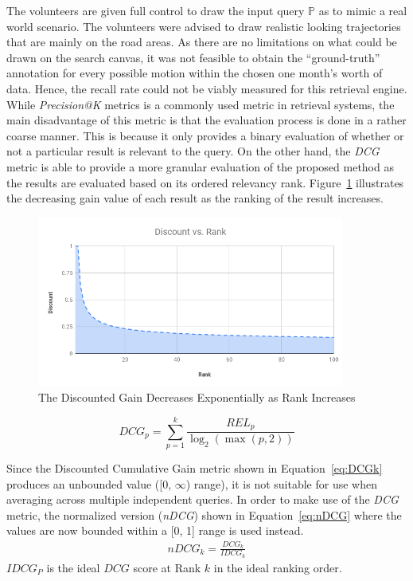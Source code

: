 The volunteers are given full control to draw the input query $\mathbb{P}$ as to mimic a real world scenario. The volunteers were advised to draw realistic looking trajectories that are mainly on the road areas. As there are no limitations on what could be drawn on the search canvas, it was not feasible to  obtain the ``ground-truth'' annotation for every possible motion within the chosen one month's worth of data. Hence, the recall rate could not be viably measured for this retrieval engine. While \textit{Precision@K} metrics is a commonly used metric in retrieval systems, the main disadvantage of this metric is that the evaluation process is done in a rather coarse manner. This is because it only provides a binary evaluation of whether or not a particular result is relevant to the query. On the other hand, the \textit{DCG} metric is able to provide a more granular evaluation of the proposed method as the results are evaluated based on its ordered relevancy rank. Figure~\ref{fig:dcgGain} illustrates the decreasing gain value of each result as the ranking of the
result increases.
\begin{figure}[!tb]
\centering
\includegraphics[width=0.9\textwidth]{image/retrievalTwo/discountvsrank.png}
\caption{The Discounted Gain Decreases Exponentially as Rank Increases}
\label{fig:dcgGain}       %
\end{figure}
\begin{equation}
\label{eq:DCGk}
DCG_p = \sum_{p=1}^k\frac{REL_{p}}{\log_2 (\max (p,2))}
\end{equation}

Since the Discounted Cumulative Gain metric shown in Equation~\ref{eq:DCGk} produces an unbounded value ([0, $\infty$) range), it is not suitable for use when averaging across multiple independent queries. In order to make use of the \textit{DCG} metric, the normalized version (\textit{nDCG}) shown in Equation~\ref{eq:nDCG} where
the values are now bounded within a [0, 1] range is used instead.
\begin{align}
\label{eq:nDCG}
\textit{nDCG}_k = \frac{DCG_k}{IDCG_k}
\end{align}
$IDCG_P$ is the ideal $DCG$ score at Rank $k$ in the ideal ranking order.

